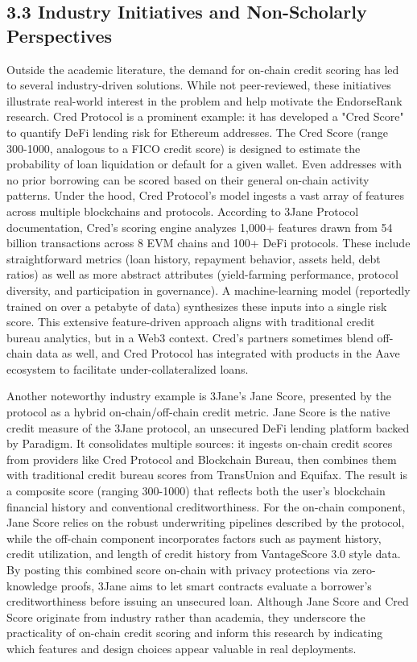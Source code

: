 \documentclass[12pt]{article}
\begin{document}
\subsection*{3.3 Industry Initiatives and Non-Scholarly Perspectives}
\label{sec:industry-initiatives-and-non-scholarly-perspectives}

Outside the academic literature, the demand for on-chain credit scoring has led to several industry-driven solutions. While not peer-reviewed, these initiatives illustrate real-world interest in the problem and help motivate the EndorseRank research. Cred Protocol is a prominent example: it has developed a "Cred Score" to quantify DeFi lending risk for Ethereum addresses. The Cred Score (range 300-1000, analogous to a FICO credit score) is designed to estimate the probability of loan liquidation or default for a given wallet. Even addresses with no prior borrowing can be scored based on their general on-chain activity patterns. Under the hood, Cred Protocol's model ingests a vast array of features across multiple blockchains and protocols. According to 3Jane Protocol documentation, Cred's scoring engine analyzes 1,000+ features drawn from 54 billion transactions across 8 EVM chains and 100+ DeFi protocols. These include straightforward metrics (loan history, repayment behavior, assets held, debt ratios) as well as more abstract attributes (yield-farming performance, protocol diversity, and participation in governance). A machine-learning model (reportedly trained on over a petabyte of data) synthesizes these inputs into a single risk score. This extensive feature-driven approach aligns with traditional credit bureau analytics, but in a Web3 context. Cred's partners sometimes blend off-chain data as well, and Cred Protocol has integrated with products in the Aave ecosystem to facilitate under-collateralized loans.


Another noteworthy industry example is 3Jane's Jane Score, presented by the protocol as a hybrid on-chain/off-chain credit metric. Jane Score is the native credit measure of the 3Jane protocol, an unsecured DeFi lending platform backed by Paradigm. It consolidates multiple sources: it ingests on-chain credit scores from providers like Cred Protocol and Blockchain Bureau, then combines them with traditional credit bureau scores from TransUnion and Equifax. The result is a composite score (ranging 300-1000) that reflects both the user's blockchain financial history and conventional creditworthiness. For the on-chain component, Jane Score relies on the robust underwriting pipelines described by the protocol, while the off-chain component incorporates factors such as payment history, credit utilization, and length of credit history from VantageScore 3.0 style data. By posting this combined score on-chain with privacy protections via zero-knowledge proofs, 3Jane aims to let smart contracts evaluate a borrower's creditworthiness before issuing an unsecured loan. Although Jane Score and Cred Score originate from industry rather than academia, they underscore the practicality of on-chain credit scoring and inform this research by indicating which features and design choices appear valuable in real deployments.
\end{document}
